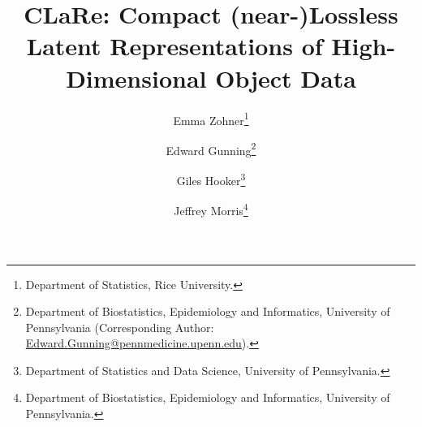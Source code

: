 \documentclass[12pt]{article}
\title{CLaRe: Compact (near-)Lossless Latent Representations of High-Dimensional Object Data}
\author{
Emma Zohner\thanks{Department of Statistics, Rice University.}
\and
Edward Gunning\thanks{Department of Biostatistics, Epidemiology and Informatics, University of Pennsylvania (Corresponding Author:
\href{mailto:Edward.Gunning@pennmedicine.upenn.edu}{Edward.Gunning@pennmedicine.upenn.edu}).}
\and
Giles Hooker\thanks{Department of Statistics and Data Science, University of Pennsylvania.} 
\and
Jeffrey Morris\thanks{Department of Biostatistics, Epidemiology and Informatics, University of Pennsylvania.}
}
\date{}
\newcommand{\1}{\mathbf{1}}
\begin{document}
\maketitle



\begin{abstract}

\end{abstract}







\clearpage

\printbibliography
\clearpage

\appendix





\end{document}

